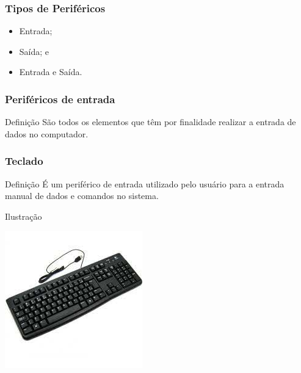 \documentclass[aspectratio=169]{beamer} %
\begin{document}
\begin{frame}
	\frametitle{Tipos de Periféricos}
		
	\begin{itemize}
		\item Entrada;
		\item Saída; e
		\item Entrada e Saída.
	\end{itemize}
\end{frame}

\begin{frame}
	\frametitle{Periféricos de entrada}
	
	\begin{block}{Defini\c cão}
		São todos os elementos que têm por finalidade realizar a entrada de dados no computador.
	\end{block}\vfill
\end{frame}

\begin{frame}
	\frametitle{Teclado}
	
	\begin{block}{Defini\c cão}
		É um periférico de entrada utilizado pelo usuário para a entrada manual de dados e comandos no sistema.
	\end{block}\vfill
	
	\begin{exampleblock}{Ilustra\c cão}
		\begin{center}
			\includegraphics[scale=0.4]{img/teclado}
		\end{center}
	\end{exampleblock}
\end{frame}
\end{document}
